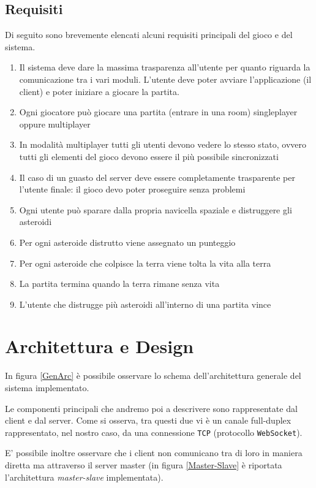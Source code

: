 \documentclass[paper=a4, fontsize=11pt]{scrartcl} %
\numberwithin{equation}{section} %
\numberwithin{figure}{section} %
\numberwithin{table}{section} %
\begin{document}
\subsection{Requisiti}
Di seguito sono brevemente elencati alcuni requisiti principali del gioco e del sistema.
\begin{enumerate}
\item Il sistema deve dare la massima trasparenza all'utente per quanto riguarda la comunicazione tra i vari moduli. L'utente deve poter avviare l'applicazione (il client) e poter iniziare a giocare la partita.
\item Ogni giocatore può giocare una partita (entrare in una room) singleplayer oppure multiplayer
\item In modalità multiplayer tutti gli utenti devono vedere lo stesso stato, ovvero tutti gli elementi del gioco devono essere il più possibile sincronizzati
\item Il caso di un guasto del server deve essere completamente trasparente per l'utente finale: il gioco devo poter proseguire senza problemi
\item Ogni utente può sparare dalla propria navicella spaziale e distruggere gli asteroidi
\item Per ogni asteroide distrutto viene assegnato un punteggio
\item Per ogni asteroide che colpisce la terra viene tolta la vita alla terra
\item La partita termina quando la terra rimane senza vita
\item L'utente che distrugge più asteroidi all'interno di una partita vince
\end{enumerate}

\section{Architettura e Design}

In figura \ref{GenArc} è possibile osservare lo schema dell'architettura generale del sistema implementato.

Le componenti principali che andremo poi a descrivere sono rappresentate dal client e dal server. Come si osserva, tra questi due vi è un canale full-duplex rappresentato, nel nostro caso, da una connessione \texttt{TCP} (protocollo \texttt{WebSocket}).

E' possibile inoltre osservare che i client non comunicano tra di loro in maniera diretta ma attraverso il server master (in figura \ref{Master-Slave} è riportata l'architettura \textit{master-slave} implementata).
\end{document}
